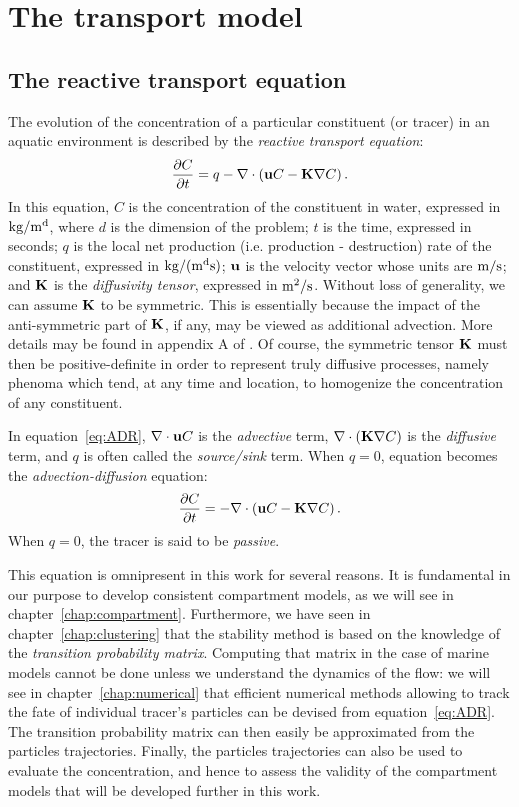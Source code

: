 \chapter{The transport model} \label{chap:transportmodel}
\section{The reactive transport equation}
The evolution of the concentration of a particular constituent (or tracer) in an aquatic environment is described by the \textit{reactive transport equation}:
\begin{equation}\label{eq:ADR}
	\frac{\partial C}{\partial t} = q-\nabla \cdot \left(\b uC - \b K \nabla C\right).
\end{equation}
In this equation, $C$ is the concentration of the constituent in water, expressed in $\rm{kg/m^d}$, where $d$ is the dimension of the problem; $t$ is the time, expressed in seconds; $q$ is the local net production (i.e. production - destruction) rate of the constituent, expressed in $\rm{kg/(m^ds)}$; $\b u$ is the velocity vector whose units are $\rm{m/s}$; and $\b K$ is the \textit{diffusivity tensor}, expressed in $\rm{m^2/s}$. Without loss of generality, we can assume $\b K$ to be symmetric. This is essentially because the impact of the anti-symmetric part of $\b K$, if any, may be viewed as additional advection. More details may be found in appendix A of \cite{deleersnijder2001concept}. Of course, the symmetric tensor $\b K$ must then be positive-definite in order to represent truly diffusive processes, namely phenoma which tend, at any time and location, to homogenize the concentration of any constituent.

In equation~\eqref{eq:ADR}, $\nabla \cdot \b u C$ is the \textit{advective} term, $\nabla \cdot (\b K \nabla C)$ is the \textit{diffusive} term, and $q$ is often called the \textit{source/sink} term. When $q=0$, equation becomes the \textit{advection-diffusion} equation:
\begin{equation}\label{eq:C_PDE_vec}
 	\frac{\partial C}{\partial t} = -\nabla \cdot \left(\b uC - \b K \nabla C\right).
 \end{equation}
 When $q=0$, the tracer is said to be \textit{passive}.

This equation is omnipresent in this work for several reasons. It is fundamental in our purpose to develop consistent compartment models, as we will see in chapter~\ref{chap:compartment}. Furthermore, we have seen in chapter~\ref{chap:clustering} that the stability method is based on the knowledge of the \textit{transition probability matrix}. Computing that matrix in the case of marine models cannot be done unless we understand the dynamics of the flow: we will see in chapter~\ref{chap:numerical} that efficient numerical methods allowing to track the fate of individual tracer's particles can be devised from equation~\eqref{eq:ADR}. The transition probability matrix can then easily be approximated from the particles trajectories. Finally, the particles trajectories can also be used to evaluate the concentration, and hence to assess the validity of the compartment models that will be developed further in this work.

